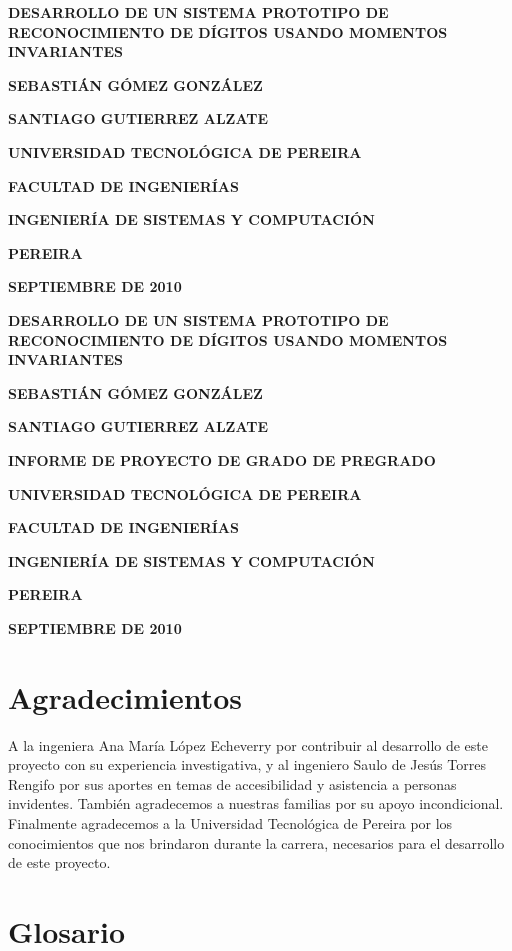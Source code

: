 \documentclass[a4paper, 11pt, oneside]{report}
\newcommand\portada{
\begin{titlepage}
\begin{center}
{\large \bf DESARROLLO DE UN SISTEMA PROTOTIPO DE RECONOCIMIENTO DE DÍGITOS USANDO MOMENTOS INVARIANTES }
\vfill
{\large\bf SEBASTIÁN GÓMEZ GONZÁLEZ \par}
{\large\bf SANTIAGO GUTIERREZ ALZATE \par}
\vfill
{\large\bf UNIVERSIDAD TECNOLÓGICA DE PEREIRA \par}
{\large\bf FACULTAD DE INGENIERÍAS \par}
{\large\bf INGENIERÍA DE SISTEMAS Y COMPUTACIÓN \par}
{\large\bf PEREIRA\par}
{\large\bf SEPTIEMBRE DE 2010 \par}
\end{center}
\end{titlepage}
}
\newcommand\contraportada{
\begin{titlepage}
\begin{center}
{\large \bf DESARROLLO DE UN SISTEMA PROTOTIPO DE RECONOCIMIENTO DE DÍGITOS USANDO MOMENTOS INVARIANTES }
\vfill
{\large\bf SEBASTIÁN GÓMEZ GONZÁLEZ \par}
{\large\bf SANTIAGO GUTIERREZ ALZATE \par}
\vfill
{\large\bf INFORME DE PROYECTO DE GRADO DE PREGRADO\par}
\vfill
{\large\bf UNIVERSIDAD TECNOLÓGICA DE PEREIRA \par}
{\large\bf FACULTAD DE INGENIERÍAS \par}
{\large\bf INGENIERÍA DE SISTEMAS Y COMPUTACIÓN \par}
{\large\bf PEREIRA\par}
{\large\bf SEPTIEMBRE DE 2010 \par}
\end{center}
\end{titlepage}
}
\begin{document}
\portada
\contraportada
\chapter*{Agradecimientos}
A la ingeniera Ana María López Echeverry por contribuir al desarrollo de este proyecto con su experiencia investigativa, y al ingeniero Saulo de Jesús Torres Rengifo por sus aportes en temas de accesibilidad y asistencia a personas invidentes. También agradecemos a nuestras familias por su apoyo incondicional.
Finalmente agradecemos a la Universidad Tecnológica de Pereira por los conocimientos que nos brindaron durante la carrera, necesarios para el desarrollo de este proyecto.
\tableofcontents
\listoftables
\listoffigures
\chapter*{Glosario}
\end{document}
